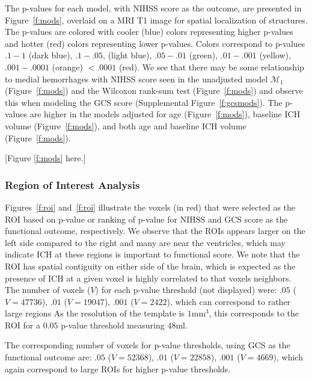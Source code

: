 \documentclass[10pt]{article}\usepackage[]{graphicx}\usepackage[]{color}
\begin{document}
The p-values for each model, with NIHSS score as the outcome, are presented in Figure~\ref{f:mods}, overlaid on a MRI T1 image for spatial localization of structures.  The p-values are colored with cooler (blue) colors representing higher p-values and hotter (red) colors representing lower p-values.  Colors correspond to p-values $.1-1$ (dark blue), $.1-.05$, (light blue), $.05-.01$ (green), $.01-.001$ (yellow),  $.001-.0001$ (orange) $< .0001$ (red).  We see that there may be some relationship to medial hemorrhages with NIHSS score seen in the unadjusted model $\mathcal{M}_1$ (Figure~\ref{f:mods}\protect{}) and the Wilcoxon rank-sum test (Figure~\ref{f:mods}\protect{}) and observe this when modeling the GCS score (Supplemental Figure~\ref{f:gcsmods}).  The p-values are higher in the models adjusted for age (Figure~\ref{f:mods}\protect{}), baseline ICH volume (Figure~\ref{f:mods}\protect{}), and both age and baseline ICH volume (Figure~\ref{f:mods}\protect{}).  

[Figure \ref{f:mods} here.]

\subsubsection{Region of Interest Analysis}




Figures~\ref{f:roi}\protect{} and~\ref{f:roi}\protect{} illustrate the voxels (in red) that were selected as the ROI based on p-value or ranking of p-value for NIHSS and GCS score as the functional outcome, respectively.  We observe that the ROIs appears larger on the left side compared to the right and many are near the ventricles, which may indicate ICH at these regions is important to functional score.  We note that the ROI has spatial contiguity on either side of the brain, which is expected as the presence of ICH at a given voxel is highly correlated to that voxels neighbors.  
The number of voxels ($V$) for each p-value threshold (not displayed) were: $.05$ ($V = 47736$), $.01$ ($V = 19047$), $.001$ ($V = 2422$), which can correspond to rather large regions  As the resolution of the template is $1$mm$^3$, this corresponds to the ROI for a $0.05$ p-value threshold measuring $48$ml. 



The corresponding number of voxels for p-value thresholds, using GCS as the functional outcome are:  $.05$ ($V = 52368$), $.01$ ($V = 22858$), $.001$ ($V = 4669$), which again correspond to large ROIs for higher p-value thresholds.
\end{document}
